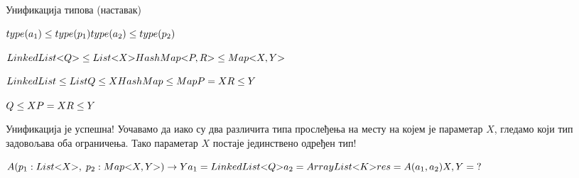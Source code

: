 \documentclass[xcolor=table]{beamer}
\begin{document}
\begin{frame}[allowframebreaks]{Унификација типова (наставак)}
        \framebreak
        
        \begin{math}
type(a_1) \leq type(p_1)
\newline
type(a_2) \leq type(p_2)
\newline
        \end{math}
        
        \framebreak
        
        \begin{math}
LinkedList\mathord{<}Q\mathord{>} \leq List\mathord{<}X\mathord{>}
\newline
HashMap\mathord{<}P, R\mathord{>} \leq Map\mathord{<}X, Y\mathord{>}
        \end{math}
        
        \framebreak
        
        \begin{math}
LinkedList \leq List
\newline
Q \leq X
\newline
HashMap \leq Map
\newline
P = X
\newline
R \leq Y
\newline
        \end{math}
        
        \framebreak
        
        \begin{math}
Q \leq X
\newline
P = X
\newline
R \leq Y
\newline
        \end{math}
        
        Унификација је успешна!
        \newline\newline
        Уочавамо да иако су два различита типа прослеђења на месту на којем је параметар \begin{math}X\end{math}, гледамо који тип задовољава оба ограничења.
        \newline\newline
        Тако параметар \begin{math}X\end{math} постаје јединствено одређен тип!
        
        \framebreak
        
        \begin{math}
A(p_1: List\mathord{<}X\mathord{>},\;p_2: Map\mathord{<}X, Y\mathord{>})\to Y
\newline
a_1 = LinkedList\mathord{<}Q\mathord{>}
\newline
a_2 = ArrayList\mathord{<}K\mathord{>}
\newline
\newline
res = A(a_1, a_2)
\newline
X, Y = \;?
        \end{math}
        

\end{frame}
\end{document}
